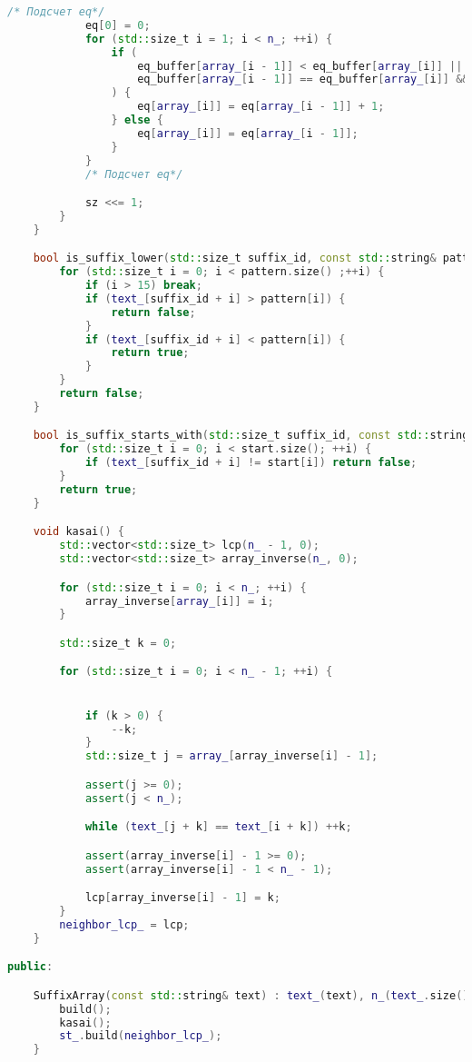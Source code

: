 \begin{lstlisting}[language=C++]
            /* Подсчет eq*/
            eq[0] = 0;
            for (std::size_t i = 1; i < n_; ++i) {
                if (
                    eq_buffer[array_[i - 1]] < eq_buffer[array_[i]] ||
                    eq_buffer[array_[i - 1]] == eq_buffer[array_[i]] && eq_buffer[(array_[i - 1] + sz) % n_] < eq_buffer[(array_[i] + sz) % n_]
                ) {
                    eq[array_[i]] = eq[array_[i - 1]] + 1;
                } else {
                    eq[array_[i]] = eq[array_[i - 1]];
                }
            }
            /* Подсчет eq*/

            sz <<= 1;
        }
    }

    bool is_suffix_lower(std::size_t suffix_id, const std::string& pattern) {
        for (std::size_t i = 0; i < pattern.size() ;++i) {
            if (i > 15) break;
            if (text_[suffix_id + i] > pattern[i]) {
                return false;
            } 
            if (text_[suffix_id + i] < pattern[i]) {
                return true;
            }
        }
        return false;
    }

    bool is_suffix_starts_with(std::size_t suffix_id, const std::string& start) {
        for (std::size_t i = 0; i < start.size(); ++i) {
            if (text_[suffix_id + i] != start[i]) return false;
        }
        return true;
    }

    void kasai() {
        std::vector<std::size_t> lcp(n_ - 1, 0);
        std::vector<std::size_t> array_inverse(n_, 0);

        for (std::size_t i = 0; i < n_; ++i) {
            array_inverse[array_[i]] = i;
        }

        std::size_t k = 0;

        for (std::size_t i = 0; i < n_ - 1; ++i) {


            if (k > 0) {
                --k;
            }
            std::size_t j = array_[array_inverse[i] - 1];

            assert(j >= 0);
            assert(j < n_);

            while (text_[j + k] == text_[i + k]) ++k;

            assert(array_inverse[i] - 1 >= 0);
            assert(array_inverse[i] - 1 < n_ - 1);

            lcp[array_inverse[i] - 1] = k;
        }
        neighbor_lcp_ = lcp;
    }

public:

    SuffixArray(const std::string& text) : text_(text), n_(text_.size() + 1), array_(n_, -1), neighbor_lcp_(n_ - 1), st_() {
        build();
        kasai();
        st_.build(neighbor_lcp_);
    }



\end{lstlisting}
